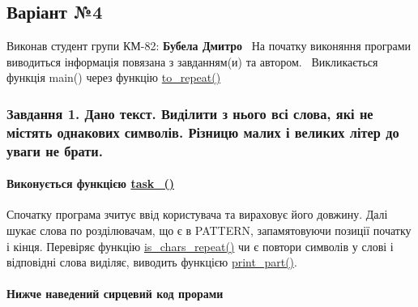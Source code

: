 \begin{center} \subsection*{Варіант №4}\end{center} 

\begin{center} \end{center}  Виконав студент групи КМ-\/82\+: {\bfseries Бубела Дмитро}~\newline
 На початку виконяння програми виводиться інформація пов\textquotesingle{}язана з завданням(и) та автором.~\newline
Викликається функція main() через функцію \hyperlink{main_8c_a590198f8fc1086cc47278ee8ddfa08d2}{to\+\_\+repeat()} \subsubsection*{Завдання 1. Дано текст. Виділити з нього всі слова, які не містять однакових символів. Різницю малих і великих літер до уваги не брати.}

\paragraph*{Виконується функцією \hyperlink{main_8c_a2e10594dc040249a898e2880b4c64322}{task\+\_()}}

Спочатку програма зчитує ввід користувача та вираховує його довжину. Далі шукає слова по розділювачам, що є в {\ttfamily P\+A\+T\+T\+E\+RN}, запам\textquotesingle{}ятовуючи позиції початку і кінця. Перевіряє функцію \hyperlink{main_8c_a9f2357981154612b8f19cdb92afe9308}{is\+\_\+chars\+\_\+repeat()} чи є повтори символів у слові і відповідні слова виділяє, виводить функцією \hyperlink{main_8c_aade7efb4781be6777c4015fa8610569f}{print\+\_\+part()}. \paragraph*{Нижче наведений сирцевий код прорами}



